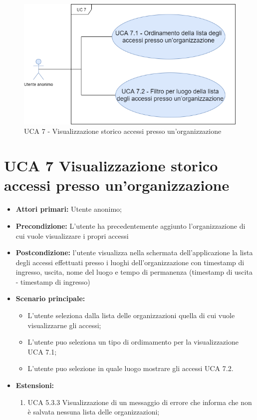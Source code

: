 \newpage
\begin{figure}[h]
	\centering
	\caption{UCA 7 - Visualizzazione storico accessi presso un’organizzazione}
	\includegraphics[scale=0.5]{sezioni/UseCase/Immagini/UCA7.png}
\end{figure}
\section{UCA 7 Visualizzazione storico accessi presso un’organizzazione}%
\begin{itemize}
\item \textbf{Attori primari:} Utente anonimo;
\item \textbf{Precondizione:} L’utente ha precedentemente aggiunto l’organizzazione di cui vuole visualizzare i propri accessi 
\item \textbf{Postcondizione:} l’utente visualizza nella schermata dell’applicazione la lista degli accessi effettuati presso i luoghi dell’organizzazione con timestamp di ingresso, uscita, nome del luogo e tempo di permanenza (timestamp di uscita - timestamp di ingresso)
\item \textbf{Scenario principale:} 
\begin{itemize}
\item L’utente seleziona dalla lista delle organizzazioni quella di cui vuole visualizzarne gli accessi;
\item L'utente puo seleziona un tipo di ordimamento per la visualizzazione UCA 7.1;
\item L'utente puo selezione in quale luogo mostrare gli accessi UCA 7.2.
\end{itemize}
\item \textbf{Estensioni:}
\begin{enumerate}
	\item UCA 5.3.3 Visualizzazione di un messaggio di errore che informa che non è salvata nessuna lista delle organizzazioni;	
\end{enumerate}	
\end{itemize}

